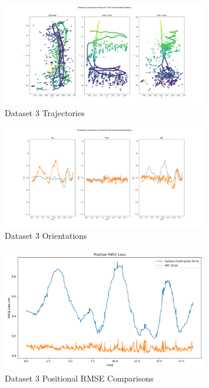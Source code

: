 \documentclass{article}
\begin{document}
\begin{figure}[H]
    \centering
    \includegraphics[width=0.8\textwidth]{./imgs/task4/studentdata3_ukf_positions.png}
    \caption{Dataset 3 Trajectories}
\end{figure}

\begin{figure}[H]
    \centering
    \includegraphics[width=0.8\textwidth]{./imgs/task4/studentdata3_ukf_orientations.png}
    \caption{Dataset 3 Orientations}
\end{figure}

\begin{figure}[H]
    \centering
    \includegraphics[width=0.8\textwidth]{./imgs/task4/studentdata3_ukf_position_rmse.png}
    \caption{Dataset 3 Positional RMSE Comparisons}
\end{figure}
\end{document}
